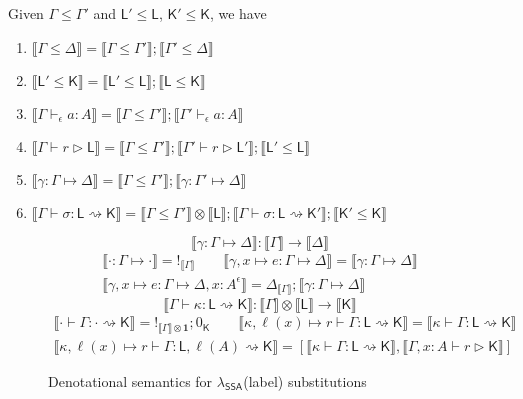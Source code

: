 \documentclass[acmsmall,screen,review]{acmart}
\newcommand{\mb}[1]{\ensuremath{\mathbf{#1}}}
\newcommand{\ms}[1]{\ensuremath{\mathsf{#1}}}
\newcommand{\thyp}[3]{#1 : {#2}^{#3}}
\newcommand{\bhyp}[2]{#1 : #2}
\newcommand{\hasty}[4]{#1 \vdash_{#2} #3: {#4}}
\newcommand{\haslb}[3]{#1 \vdash #2 \rhd #3}
\newcommand{\issubst}[3]{#1: #2 \mapsto #3}
\newcommand{\lbsubst}[4]{#1 \vdash #2: #3 \rightsquigarrow #4}
\newcommand{\dnt}[1]{\llbracket{#1}\rrbracket}
\newcommand{\tmor}[1]{{!}_{#1}}
\newcommand{\dmor}[1]{{\Delta}_{#1}}
\newcommand{\isotopessa}{\(\lambda_{\ms{SSA}}\)}
\begin{document}
\begin{theorem}
  Given $\Gamma \leq \Gamma'$ and $\ms{L}' \leq \ms{L}$, $\ms{K}' \leq \ms{K}$, we have
  \begin{enumerate}
    \item $\dnt{\Gamma \leq \Delta} = \dnt{\Gamma \leq \Gamma'};\dnt{\Gamma' \leq \Delta}$
    \item $\dnt{\ms{L}' \leq \ms{K}} = \dnt{\ms{L}' \leq \ms{L}};\dnt{\ms{L} \leq \ms{K}}$
    \item $\dnt{\hasty{\Gamma}{\epsilon}{a}{A}} 
      = \dnt{\Gamma \leq \Gamma'};\dnt{\hasty{\Gamma'}{\epsilon}{a}{A}}$
    \item $\dnt{\haslb{\Gamma}{r}{\ms{L}}}
      = \dnt{\Gamma \leq \Gamma'}
      ; \dnt{\haslb{\Gamma'}{r}{\ms{L}'}}
      ; \dnt{\ms{L}' \leq \ms{L}}$
    \item $\dnt{\issubst{\gamma}{\Gamma}{\Delta}}
      = \dnt{\Gamma \leq \Gamma'};\dnt{\issubst{\gamma}{\Gamma'}{\Delta}}$
    \item $\dnt{\lbsubst{\Gamma}{\sigma}{\ms{L}}{\ms{K}}}
      = \dnt{\Gamma \leq \Gamma'} \otimes \dnt{\ms{L}}
      ; \dnt{\lbsubst{\Gamma}{\sigma}{\ms{L}}{\ms{K}'}}
      ; \dnt{\ms{K}' \leq \ms{K}}
      $
  \end{enumerate}
\end{theorem}

\begin{figure}[H]
  \begin{equation*}
    \boxed{\dnt{\issubst{\gamma}{\Gamma}{\Delta}} 
      : \dnt{\Gamma} \to \dnt{\Delta}}
  \end{equation*}
  \begin{gather*}
    \dnt{\issubst{\cdot}{\Gamma}{\cdot}} = \tmor{\dnt{\Gamma}}
    \qquad
    \dnt{\issubst{\gamma, x \mapsto e}{\Gamma}{\Delta}} 
    = \dnt{\issubst{\gamma}{\Gamma}{\Delta}}
    \\
    \dnt{\issubst{\gamma, x \mapsto e}{\Gamma}{\Delta, \thyp{x}{A}{\epsilon}}}
    = \dmor{\dnt{\Gamma}};\dnt{\issubst{\gamma}{\Gamma}{\Delta}}
  \end{gather*}
  \begin{equation*}
    \boxed{\dnt{\lbsubst{\Gamma}{\kappa}{\ms{L}}{\ms{K}}} 
      : \dnt{\Gamma} \otimes \dnt{\ms{L}} \to \dnt{\ms{K}}}
  \end{equation*}
  \begin{gather*}
    \dnt{\lbsubst{\cdot}{\Gamma}{\cdot}{\ms{K}}} 
      = \tmor{\dnt{\Gamma} \otimes \mb{1}};0_{\ms{K}} \qquad
    \dnt{\lbsubst{\kappa, \ell(x) \mapsto r}{\Gamma}{\ms{L}}{\ms{K}}}
      = \dnt{\lbsubst{\kappa}{\Gamma}{\ms{L}}{\ms{K}}}
    \\
    \dnt{\lbsubst{\kappa, \ell(x) \mapsto r}{\Gamma}{\ms{L}, \ell(A)}{\ms{K}}}
      = [
        \dnt{\lbsubst{\kappa}{\Gamma}{\ms{L}}{\ms{K}}}, 
        \dnt{\haslb{\Gamma, \bhyp{x}{A}}{r}{\ms{K}}}
      ]
  \end{gather*}
  \caption{Denotational semantics for \isotopessa (label) substitutions}
  \Description{}
  \label{fig:ssa-vsubst-sem} 
\end{figure}
\end{document}
